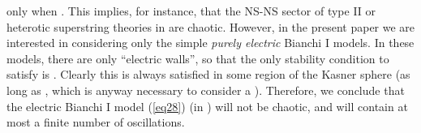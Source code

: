 \documentclass[a4paper,12pt]{article}
\begin{document}
only when \coordHE{}. This implies, for instance, that the NS-NS 
sector of type II or heterotic superstring theories in \coordHE{} are 
chaotic. However, in the present paper we are interested in considering 
only the simple {\it purely electric} Bianchi I models. In these models, 
there are only ``electric walls'', so that the only stability condition 
to satisfy is \coordHE{}. 
Clearly this is always satisfied in some region of the Kasner sphere 
\coordHE{}
(as long as \coordHE{}, which is anyway necessary to 
consider a \coordHE{}). Therefore, we conclude that the electric Bianchi 
I model (\ref{eq28}) (in \coordHE{}) will not be chaotic, and will 
contain at most a finite number of oscillations. 
\end{document}
